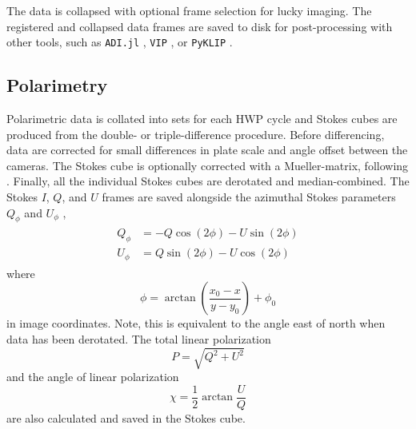 The data is collapsed with optional frame selection for lucky imaging. The registered and collapsed data frames are saved to disk for post-processing with other tools, such as \texttt{ADI.jl} \citep{lucas_adijl_2020}, \texttt{VIP} \citep{gomez_gonzalez_vip_2017,christiaens_vip_2023}, or \texttt{PyKLIP} \citep{wang_pyklip_2015}.

\subsection{Polarimetry}

Polarimetric data is collated into sets for each HWP cycle and Stokes cubes are produced from the double- or triple-difference procedure. Before differencing, data are corrected for small differences in plate scale and angle offset between the cameras. The Stokes cube is optionally corrected with a Mueller-matrix, following \citet{holstein_polarimetric_2020,zhang_characterizing_2023}. Finally, all the individual Stokes cubes are derotated and median-combined. The Stokes $I$, $Q$, and $U$ frames are saved alongside the azimuthal Stokes parameters $Q_\phi$ and $U_\phi$ \citep{monnier_multiple_2019,boer_polarimetric_2020}, 
\begin{align}
\begin{split}
    \label{eqn:az_stokes}
    Q_\phi &= -Q\cos{\left(2\phi\right)} - U\sin{\left(2\phi\right)} \\
    U_\phi &= Q\sin{\left(2\phi\right)} - U\cos{\left(2\phi\right)}
\end{split}
\end{align}
where
\begin{equation}
    \phi = \arctan{\left( \frac{x_0 - x}{y - y_0} \right)} + \phi_0
\end{equation}
in image coordinates. Note, this is equivalent to the angle east of north when data has been derotated. The total linear polarization
\begin{equation}
    P = \sqrt{Q^2 + U^2}
\end{equation}
and the angle of linear polarization
\begin{equation}
    \chi = \frac12\arctan{\frac{U}{Q}}
\end{equation}
are also calculated and saved in the Stokes cube.